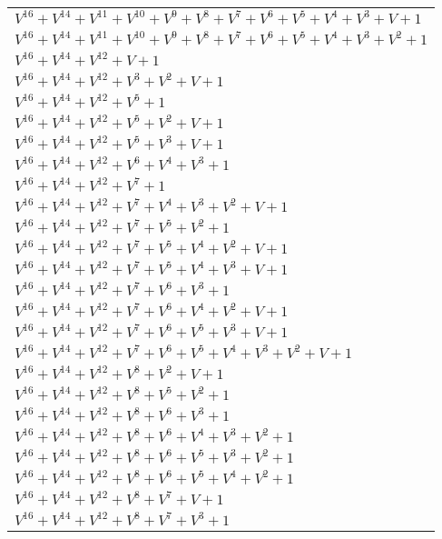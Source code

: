 \documentclass[12pt]{article}
\begin{document}
\begin{adjustwidth}{-4cm}{}
\begin{center}
\begin{longtable}{|l|}
$V^{16}  +V^{14}  +V^{11}  +V^{10}  +V^{9}  +V^{8}  +V^{7}  +V^{6}  +V^{5}  +V^{4}  +V^{3}  + V + 1$ \\
$V^{16}  +V^{14}  +V^{11}  +V^{10}  +V^{9}  +V^{8}  +V^{7}  +V^{6}  +V^{5}  +V^{4}  +V^{3}  +V^{2}  + 1$ \\
$V^{16}  +V^{14}  +V^{12}  + V + 1$ \\
$V^{16}  +V^{14}  +V^{12}  +V^{3}  +V^{2}  + V + 1$ \\
$V^{16}  +V^{14}  +V^{12}  +V^{5}  + 1$ \\
$V^{16}  +V^{14}  +V^{12}  +V^{5}  +V^{2}  + V + 1$ \\
$V^{16}  +V^{14}  +V^{12}  +V^{5}  +V^{3}  + V + 1$ \\
$V^{16}  +V^{14}  +V^{12}  +V^{6}  +V^{4}  +V^{3}  + 1$ \\
$V^{16}  +V^{14}  +V^{12}  +V^{7}  + 1$ \\
$V^{16}  +V^{14}  +V^{12}  +V^{7}  +V^{4}  +V^{3}  +V^{2}  + V + 1$ \\
$V^{16}  +V^{14}  +V^{12}  +V^{7}  +V^{5}  +V^{2}  + 1$ \\
$V^{16}  +V^{14}  +V^{12}  +V^{7}  +V^{5}  +V^{4}  +V^{2}  + V + 1$ \\
$V^{16}  +V^{14}  +V^{12}  +V^{7}  +V^{5}  +V^{4}  +V^{3}  + V + 1$ \\
$V^{16}  +V^{14}  +V^{12}  +V^{7}  +V^{6}  +V^{3}  + 1$ \\
$V^{16}  +V^{14}  +V^{12}  +V^{7}  +V^{6}  +V^{4}  +V^{2}  + V + 1$ \\
$V^{16}  +V^{14}  +V^{12}  +V^{7}  +V^{6}  +V^{5}  +V^{3}  + V + 1$ \\
$V^{16}  +V^{14}  +V^{12}  +V^{7}  +V^{6}  +V^{5}  +V^{4}  +V^{3}  +V^{2}  + V + 1$ \\
$V^{16}  +V^{14}  +V^{12}  +V^{8}  +V^{2}  + V + 1$ \\
$V^{16}  +V^{14}  +V^{12}  +V^{8}  +V^{5}  +V^{2}  + 1$ \\
$V^{16}  +V^{14}  +V^{12}  +V^{8}  +V^{6}  +V^{3}  + 1$ \\
$V^{16}  +V^{14}  +V^{12}  +V^{8}  +V^{6}  +V^{4}  +V^{3}  +V^{2}  + 1$ \\
$V^{16}  +V^{14}  +V^{12}  +V^{8}  +V^{6}  +V^{5}  +V^{3}  +V^{2}  + 1$ \\
$V^{16}  +V^{14}  +V^{12}  +V^{8}  +V^{6}  +V^{5}  +V^{4}  +V^{2}  + 1$ \\
$V^{16}  +V^{14}  +V^{12}  +V^{8}  +V^{7}  + V + 1$ \\
$V^{16}  +V^{14}  +V^{12}  +V^{8}  +V^{7}  +V^{3}  + 1$ \\

\end{longtable}
\end{center}
\end{adjustwidth}
\end{document}
